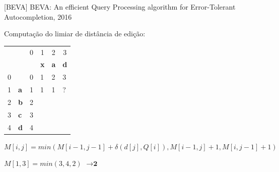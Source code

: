 \documentclass[11pt]{beamer}
\begin{document}
\begin{frame}{[BEVA] BEVA: An efficient Query Processing algorithm for Error-Tolerant Autocompletion, 2016}

    Computação do limiar de distância de edição:
  
    \begin{table}[]
    \begin{tabular}{llllll}
     &  & \multicolumn{1}{c}{{\color[HTML]{656565} 0}} & \multicolumn{1}{c}{{\color[HTML]{656565} 1}} & \multicolumn{1}{c}{{\color[HTML]{656565} 2}} & \multicolumn{1}{c}{{\color[HTML]{656565} 3}} \\
     &  &  & \textbf{x} & \textbf{a} & \textbf{d} \\ \cline{3-6} 
    {\color[HTML]{656565} 0} & \multicolumn{1}{l|}{} & \multicolumn{1}{l|}{{\color[HTML]{000000} 0}} & \multicolumn{1}{l|}{{\color[HTML]{000000} 1}} & \multicolumn{1}{l|}{{\color[HTML]{000000} 2}} & \multicolumn{1}{l|}{{\color[HTML]{000000} 3}} \\ \cline{3-6} 
    {\color[HTML]{656565} 1} & \multicolumn{1}{l|}{\textbf{a}} & \multicolumn{1}{l|}{{\color[HTML]{000000} 1}} & \multicolumn{1}{l|}{{\color[HTML]{000000} 1}} & \multicolumn{1}{l|}{{\color[HTML]{000000} 1}} & \multicolumn{1}{l|}{{\color[HTML]{000000} ?}} \\ \cline{3-6} 
    {\color[HTML]{656565} 2} & \multicolumn{1}{l|}{\textbf{b}} & \multicolumn{1}{c|}{{\color[HTML]{000000} 2}} & \multicolumn{1}{c|}{{\color[HTML]{000000} }} & \multicolumn{1}{c|}{{\color[HTML]{000000} }} & \multicolumn{1}{c|}{{\color[HTML]{000000} }} \\ \cline{3-6} 
    {\color[HTML]{656565} 3} & \multicolumn{1}{l|}{\textbf{c}} & \multicolumn{1}{l|}{{\color[HTML]{000000} 3}} & \multicolumn{1}{l|}{{\color[HTML]{000000} }} & \multicolumn{1}{l|}{{\color[HTML]{000000} }} & \multicolumn{1}{l|}{{\color[HTML]{000000} }} \\ \cline{3-6} 
    {\color[HTML]{656565} 4} & \multicolumn{1}{l|}{\textbf{d}} & \multicolumn{1}{c|}{{\color[HTML]{000000} 4}} & \multicolumn{1}{c|}{{\color[HTML]{000000} }} & \multicolumn{1}{c|}{{\color[HTML]{000000} }} & \multicolumn{1}{c|}{{\color[HTML]{000000} }} \\ \cline{3-6} 
    \end{tabular}
    \end{table}
    
    \small
    $M[i, j] = min(M[i - 1, j - 1] + \delta(d[j], Q[i]), M[i - 1, j] + 1, M[i, j - 1] + 1)$ \pause
    
    $M[1, 3] = min(3, 4, 2)$ \pause $\to \textbf{2}$
    
\end{frame}
\end{document}
